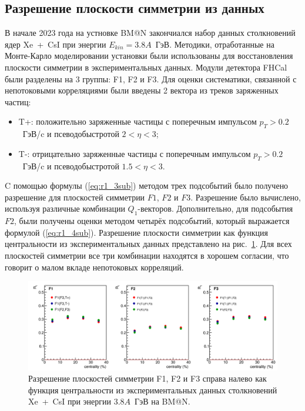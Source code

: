 \subsection{Разрешение плоскости симметрии из данных}

В начале 2023 года на устновке BM@N закончиался набор данных столкновений ядер Xe~+~CsI при энергии $E_{kin}=3.8A$~ГэВ.
Методики, отработанные на Монте-Карло моделировании установки были использованы для восстановления плоскости симметрии в экспериментальных данных.
Модули детектора FHCal были разделены на 3 группы: F1, F2 и F3.
Для оценки систематики, связанной с непотоковыми корреляциями были введены 2 вектора из треков заряженных частиц:
\begin{itemize}
    \item T+: положительно заряженные частицы с поперечным импульсом $p_T > 0.2$~ГэВ/c и псеводобыстротой $2<\eta<3$;
    \item T-: отрицательно заряженные частицы с поперечным импульсом $p_T > 0.2$~ГэВ/c и псеводобыстротой $1.5<\eta<3$.
\end{itemize}

C помощью формулы (\ref{eq:r1_3sub}) методом трех подсобытий было получено разрешение для плоскостей симметрии $F1$, $F2$ и $F3$.
Разрешение было вычислено, используя различные комбинации $Q_1$-векторов.
Дополнительно, для подсобытия $F2$, были получены оценки методом четырёх подсобытий, который выражается формулой (\ref{eq:r1_4sub}).
Разрешение плоскости симметрии как функция центральности из экспериментальных данных представлено на рис.~\ref{fig:bmn_r1_data}.
Для всех плоскостей симметрии все три комбинации находятся в хорошем согласии, что говорит о малом вкладе непотоковых корреляций.

\begin{figure}[ht]
\begin{center}
\includegraphics[width=0.95\linewidth]{images/F123_centrality.png}
\caption{ 
    Разрешение плоскостей симметрии F1, F2 и F3 справа налево как функция центральности из экспериментальных данных столкновений Xe~+~CsI при энергии $3.8A$~ГэВ на BM@N.
}
\label{fig:bmn_r1_data}
\end{center}
\end{figure}

